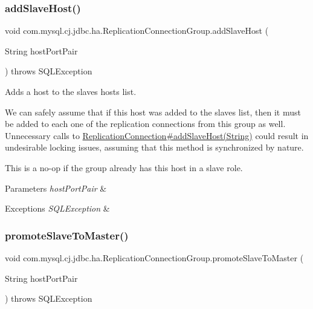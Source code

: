 \subsubsection{\texorpdfstring{add\+Slave\+Host()}{addSlaveHost()}}
{\footnotesize\ttfamily void com.\+mysql.\+cj.\+jdbc.\+ha.\+Replication\+Connection\+Group.\+add\+Slave\+Host (\begin{DoxyParamCaption}\item[{String}]{host\+Port\+Pair }\end{DoxyParamCaption}) throws S\+Q\+L\+Exception}

Adds a host to the slaves hosts list.

We can safely assume that if this host was added to the slaves list, then it must be added to each one of the replication connections from this group as well. Unnecessary calls to \mbox{\hyperlink{}{Replication\+Connection\#add\+Slave\+Host(\+String)}} could result in undesirable locking issues, assuming that this method is synchronized by nature.

This is a no-\/op if the group already has this host in a slave role.


\begin{DoxyParams}{Parameters}
{\em host\+Port\+Pair} & \\
\hline
\end{DoxyParams}

\begin{DoxyExceptions}{Exceptions}
{\em S\+Q\+L\+Exception} & \\
\hline
\end{DoxyExceptions}
\mbox{\label{classcom_1_1mysql_1_1cj_1_1jdbc_1_1ha_1_1_replication_connection_group_a15c7ea25c34ea77f3dedaa68eb05075d}} 
\subsubsection{\texorpdfstring{promote\+Slave\+To\+Master()}{promoteSlaveToMaster()}}
{\footnotesize\ttfamily void com.\+mysql.\+cj.\+jdbc.\+ha.\+Replication\+Connection\+Group.\+promote\+Slave\+To\+Master (\begin{DoxyParamCaption}\item[{String}]{host\+Port\+Pair }\end{DoxyParamCaption}) throws S\+Q\+L\+Exception}

